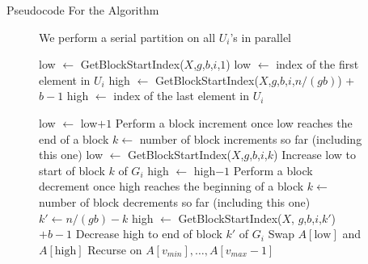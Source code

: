 \documentclass[table,serif,mathserif,final]{beamer}
\theoremstyle{remark}
\begin{document}
\begin{frame}{}
\begin{columns}[t]
\begin{column}{0.21\linewidth}
\begin{block}{\Huge Pseudocode For the Algorithm}
\begin{figure}
\begin{algorithmic}
         \Comment We perform a serial partition on all $U_i$'s in parallel

          \State low $\gets$ GetBlockStartIndex($X$,$g$,$b$,$i$,$1$)
          \Comment low $\gets$ index of the first element in $U_i$
          \State high $\gets$ GetBlockStartIndex($X$,$g$,$b$,$i$,$n/(gb)$) + $b-1$
          \Comment high $\gets$ index of the last element in $U_i$

              \State low $\gets$ low$+1$
                \Comment Perform a block increment once low reaches the end of a block
                \State $k \gets $ number of block increments so far (including this one)
                \State low $\gets$ GetBlockStartIndex($X$,$g$,$b$,$i$,$k$)
                \Comment Increase low to start of block $k$ of $G_i$
              \EndIf
            \EndWhile
              \State high $\gets$ high$-1$
                \Comment Perform a block decrement once high reaches the beginning of a block
                \State $k \gets $ number of block decrements so far (including this one)
                \State $k' \gets n/(gb) - k$
                \State high $\gets$ GetBlockStartIndex($X$, $g$,$b$,$i$,$k'$) $+b-1$
                \Comment Decrease high to end of block $k'$ of $G_i$
              \EndIf
            \EndWhile
            \State Swap $A[\text{low}]$ and $A[\text{high}]$
          \EndWhile
        \EndFor
        \State Recurse on $A[v_{min}],\ldots,A[v_{max}-1]$
      \EndIf
    \EndProcedure
  \end{algorithmic}	
\end{figure}

\end{block}

\end{column}
\begin{column}{0.02\linewidth}
\end{column}


\end{columns}
\end{frame}
\end{document}
